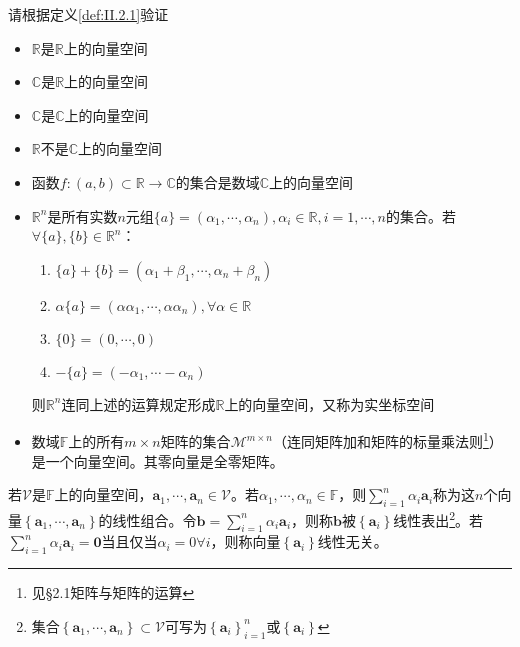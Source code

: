 \documentclass[main.tex]{subfiles}
\begin{document}
\begin{example}
请根据定义\ref{def:II.2.1}验证
\begin{itemize}
    \item $\mathbb{R}$是$\mathbb{R}$上的向量空间
    \item $\mathbb{C}$是$\mathbb{R}$上的向量空间
    \item $\mathbb{C}$是$\mathbb{C}$上的向量空间
    \item $\mathbb{R}$不是$\mathbb{C}$上的向量空间
    \item 函数$f:\left(a,b\right)\subset \mathbb{R}\rightarrow\mathbb{C}$的集合是数域$\mathbb{C}$上的向量空间
    \item $\mathbb{R}^n$是所有实数$n$元组$\{a\}=\left(\alpha_1,\cdots,\alpha_n\right),\alpha_i\in\mathbb{R},i=1,\cdots,n$的集合。若$\forall \{a\},\{b\}\in\mathbb{R}^n$：
    \begin{enumerate}
        \item $\{a\}+\{b\}=\left(\alpha_1+\beta_1,\cdots,\alpha_n+\beta_n\right)$
        \item $\alpha\{a\}=\left(\alpha\alpha_1,\cdots,\alpha\alpha_n\right),\forall\alpha\in\mathbb{R}$
        \item $\{0\}=\left(0,\cdots,0\right)$
        \item $-\{a\}=\left(-\alpha_1,\cdots-\alpha_n\right)$
    \end{enumerate}
    则$\mathbb{R}^n$连同上述的运算规定形成$\mathbb{R}$上的向量空间，又称为实坐标空间
    \item 数域$\mathbb{F}$上的所有$m\times n$矩阵的集合$\mathcal{M}^{m\times n}$（连同矩阵加和矩阵的标量乘法则\footnote{见\cite{周胜林2012线性代数}\S 2.1矩阵与矩阵的运算}）是一个向量空间。其零向量是全零矩阵。
\end{itemize}
\end{example}

\begin{definition}\label{def:II.2.2}
若$\mathcal{V}$是$\mathbb{F}$上的向量空间，$\mathbf{a}_1,\cdots,\mathbf{a}_n\in\mathcal{V}$。若$\alpha_1,\cdots,\alpha_n\in\mathbb{F}$，则$\sum_{i=1}^n\alpha_i\mathbf{a}_i$称为这$n$个向量$\left\{\mathbf{a}_1,\cdots,\mathbf{a}_n\right\}$的线性组合。令$\mathbf{b}=\sum_{i=1}^n\alpha_i\mathbf{a}_i$，则称$\mathbf{b}$被$\left\{\mathbf{a}_i\right\}$线性表出\footnote{集合$\left\{\mathbf{a}_1,\cdots,\mathbf{a}_n\right\}\subset\mathcal{V}$可写为$\left\{\mathbf{a}_i\right\}_{i=1}^n$或$\left\{\mathbf{a}_i\right\}$}。若$\sum_{i=1}^n\alpha_i\mathbf{a}_i=\bm{0}$当且仅当$\alpha_i=0\forall i$，则称向量$\left\{\mathbf{a}_i\right\}$线性无关。
\end{definition}
\end{document}
